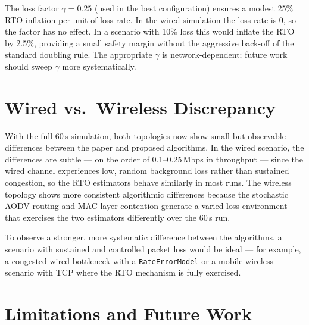 \documentclass[12pt,a4paper]{report}
\begin{document}
The loss factor $\gamma=0.25$ (used in the best configuration) ensures a
modest 25\% RTO inflation per unit of loss rate.  In the wired simulation
the loss rate is 0, so the factor has no effect.  In a scenario with 10\%
loss this would inflate the RTO by 2.5\%, providing a small safety margin
without the aggressive back-off of the standard doubling rule.  The appropriate
$\gamma$ is network-dependent; future work should sweep $\gamma$ more
systematically.

\section{Wired vs.\ Wireless Discrepancy}

With the full 60\,s simulation, both topologies now show small but
observable differences between the paper and proposed algorithms.
In the wired scenario, the differences are subtle --- on the order
of 0.1--0.25\,Mbps in throughput --- since the wired channel experiences
low, random background loss rather than sustained congestion, so the RTO
estimators behave similarly in most runs.  The wireless topology shows more
consistent algorithmic differences because the stochastic AODV routing and
MAC-layer contention generate a varied loss environment that exercises the
two estimators differently over the 60\,s run.

To observe a stronger, more systematic difference between the algorithms,
a scenario with sustained and controlled packet loss would be ideal ---
for example, a congested wired bottleneck with a \texttt{RateErrorModel}
or a mobile wireless scenario with TCP where the RTO mechanism is fully
exercised.

\section{Limitations and Future Work}
\end{document}
